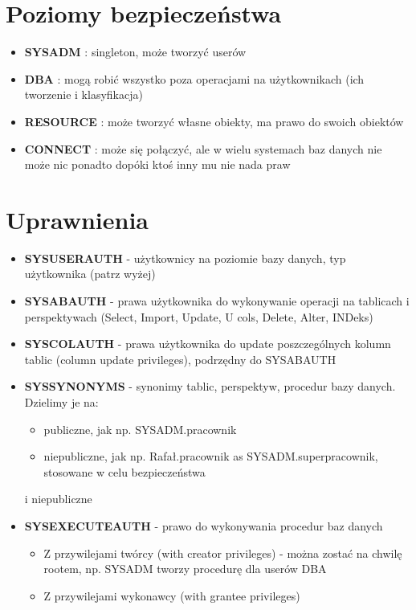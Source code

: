 \documentclass[a4paper,twoside]{article}
\begin{document}
  	\section*{Poziomy bezpieczeństwa}
  	\begin{itemize}
  		\item \textbf{SYSADM} : singleton, może tworzyć userów
  		\item \textbf{DBA} : mogą robić wszystko poza operacjami na użytkownikach (ich tworzenie i klasyfikacja)
  		\item \textbf{RESOURCE} : może tworzyć własne obiekty, ma prawo do swoich obiektów
  		\item \textbf{CONNECT} : może się połączyć, ale w wielu systemach baz danych nie może nic ponadto dopóki ktoś inny mu nie nada praw
  	\end{itemize}
  	\section*{Uprawnienia}
  	\begin{itemize}
  		\item \textbf{SYSUSERAUTH} - użytkownicy na poziomie bazy danych, typ użytkownika (patrz wyżej)
  		\item \textbf{SYSABAUTH} - prawa użytkownika do wykonywanie operacji na tablicach i perspektywach (Select, Import, Update, U cols, Delete, Alter, INDeks)
  		\item \textbf{SYSCOLAUTH} - prawa użytkownika do update poszczególnych kolumn tablic (column update privileges), podrzędny do SYSABAUTH
  		\item \textbf{SYSSYNONYMS} - synonimy tablic, perspektyw, procedur bazy danych. Dzielimy je na:
  		\begin{itemize}
  			\item publiczne, jak np. SYSADM.pracownik
  			\item niepubliczne, jak np. Rafał.pracownik as SYSADM.superpracownik, stosowane w celu bezpieczeństwa
  		\end{itemize} i niepubliczne
  		\item \textbf{SYSEXECUTEAUTH} - prawo do wykonywania procedur baz danych
  		\begin{itemize}
  			\item Z przywilejami twórcy (with creator privileges) - można zostać na chwilę rootem, np. SYSADM tworzy procedurę dla userów DBA
  			\item Z przywilejami wykonawcy (with grantee privileges)
  		\end{itemize}
  	\end{itemize}
\end{document}
